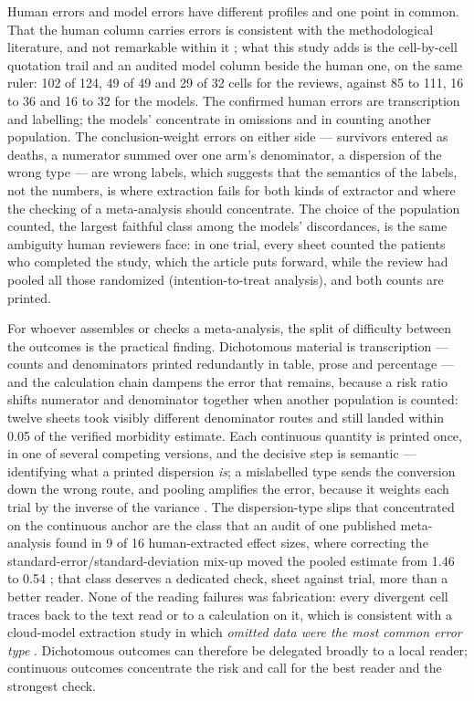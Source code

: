 \documentclass[11pt]{article}
\begin{document}
Human errors and model errors have different profiles and one point in common. That the human column carries errors is consistent with the methodological literature, and not remarkable within it \citep{gotzsche2007extraction,jones2005errors,tendal2011multiplicity,mathes2017frequency}; what this study adds is the cell-by-cell quotation trail and an audited model column beside the human one, on the same ruler: 102 of 124, 49 of 49 and 29 of 32 cells for the reviews, against 85 to 111, 16 to 36 and 16 to 32 for the models. The confirmed human errors are transcription and labelling; the models' concentrate in omissions and in counting another population. The conclusion-weight errors on either side --- survivors entered as deaths, a numerator summed over one arm's denominator, a dispersion of the wrong type --- are wrong labels, which suggests that the semantics of the labels, not the numbers, is where extraction fails for both kinds of extractor and where the checking of a meta-analysis should concentrate. The choice of the population counted, the largest faithful class among the models' discordances, is the same ambiguity human reviewers face: in one trial, every sheet counted the patients who completed the study, which the article puts forward, while the review had pooled all those randomized (intention-to-treat analysis), and both counts are printed.

For whoever assembles or checks a meta-analysis, the split of difficulty between the outcomes is the practical finding. Dichotomous material is transcription --- counts and denominators printed redundantly in table, prose and percentage --- and the calculation chain dampens the error that remains, because a risk ratio shifts numerator and denominator together when another population is counted: twelve sheets took visibly different denominator routes and still landed within 0.05 of the verified morbidity estimate. Each continuous quantity is printed once, in one of several competing versions, and the decisive step is semantic --- identifying what a printed dispersion \emph{is}; a mislabelled type sends the conversion down the wrong route, and pooling amplifies the error, because it weights each trial by the inverse of the variance \citep{higgins2023handbook}. The dispersion-type slips that concentrated on the continuous anchor are the class that an audit of one published meta-analysis found in 9 of 16 human-extracted effect sizes, where correcting the standard-error/standard-deviation mix-up moved the pooled estimate from 1.46 to 0.54 \citep{sandercock2024mixup}; that class deserves a dedicated check, sheet against trial, more than a better reader. None of the reading failures was fabrication: every divergent cell traces back to the text read or to a calculation on it, which is consistent with a cloud-model extraction study in which \emph{omitted data were the most common error type} \citep{gartlehner2024extraction}. Dichotomous outcomes can therefore be delegated broadly to a local reader; continuous outcomes concentrate the risk and call for the best reader and the strongest check.
\end{document}
